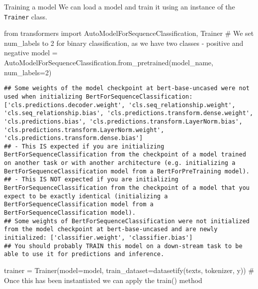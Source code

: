 \documentclass[
  10pt,
  ignorenonframetext,
  aspectratio=169]{beamer}
\newenvironment{Shaded}{\begin{snugshade}}{\end{snugshade}}
\newcommand{\CommentTok}[1]{\textcolor[rgb]{0.50,0.62,0.50}{#1}}
\newcommand{\DecValTok}[1]{\textcolor[rgb]{0.86,0.86,0.80}{#1}}
\newcommand{\ImportTok}[1]{\textcolor[rgb]{0.80,0.80,0.80}{#1}}
\newcommand{\NormalTok}[1]{\textcolor[rgb]{0.80,0.80,0.80}{#1}}
\newcommand{\OperatorTok}[1]{\textcolor[rgb]{0.94,0.94,0.82}{#1}}
\begin{document}
\begin{frame}[fragile]{Training a model}
\protect\hypertarget{training-a-model}{}
We can load a model and train it using an instance of the
\texttt{Trainer} class.

\medskip
\scriptsize

\begin{Shaded}
\begin{Highlighting}[]
\ImportTok{from}\NormalTok{ transformers }\ImportTok{import}\NormalTok{ AutoModelForSequenceClassification, Trainer}
\CommentTok{\# We set num\_labels to 2 for binary classification, as we have two classes {-} positive and negative}
\NormalTok{model }\OperatorTok{=}\NormalTok{ AutoModelForSequenceClassification.from\_pretrained(model\_name, num\_labels}\OperatorTok{=}\DecValTok{2}\NormalTok{)}
\end{Highlighting}
\end{Shaded}

\begin{verbatim}
## Some weights of the model checkpoint at bert-base-uncased were not used when initializing BertForSequenceClassification: ['cls.predictions.decoder.weight', 'cls.seq_relationship.weight', 'cls.seq_relationship.bias', 'cls.predictions.transform.dense.weight', 'cls.predictions.bias', 'cls.predictions.transform.LayerNorm.bias', 'cls.predictions.transform.LayerNorm.weight', 'cls.predictions.transform.dense.bias']
## - This IS expected if you are initializing BertForSequenceClassification from the checkpoint of a model trained on another task or with another architecture (e.g. initializing a BertForSequenceClassification model from a BertForPreTraining model).
## - This IS NOT expected if you are initializing BertForSequenceClassification from the checkpoint of a model that you expect to be exactly identical (initializing a BertForSequenceClassification model from a BertForSequenceClassification model).
## Some weights of BertForSequenceClassification were not initialized from the model checkpoint at bert-base-uncased and are newly initialized: ['classifier.weight', 'classifier.bias']
## You should probably TRAIN this model on a down-stream task to be able to use it for predictions and inference.
\end{verbatim}

\begin{Shaded}
\begin{Highlighting}[]
\NormalTok{trainer }\OperatorTok{=}\NormalTok{ Trainer(model}\OperatorTok{=}\NormalTok{model, train\_dataset}\OperatorTok{=}\NormalTok{datasetify(texts, tokenizer, y))}
\CommentTok{\# Once this has been instantiated we can apply the train() method}
\end{Highlighting}
\end{Shaded}


\end{frame}
\end{document}
